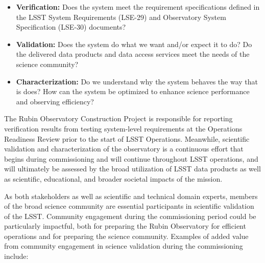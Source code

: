 \documentclass[SE,authoryear,toc]{lsstdoc}
\begin{document}
\begin{itemize}

\item \textbf{Verification:} Does the system meet the requirement specifications defined in the LSST System Requirements (LSE-29) and Observatory System Specification (LSE-30) documents?

\item \textbf{Validation:} Does the system do what we want and/or expect it to do? Do the delivered data products and data access services meet the needs of the science community?

\item \textbf{Characterization:} Do we understand why the system behaves the way that is does? How can the system be optimized to enhance science performance and observing efficiency?

\end{itemize}

The Rubin Observatory Construction Project is responsible for reporting verification results from testing system-level requirements at the Operations Readiness Review prior to the start of LSST Operations.
Meanwhile, scientific validation and characterization of the observatory is a continuous effort that begins during commissioning and will continue throughout LSST operations, and will ultimately be assessed by the broad utilization of LSST data products as well as scientific, educational, and broader societal impacts of the mission.

As both stakeholders as well as scientific and technical domain experts, members of the broad science community are essential participants in scientific validation of the LSST.
Community engagement during the commissioning period could be particularly impactful, both for preparing the Rubin Observatory for efficient operations and for preparing the science community.
Examples of added value from community engagement in science validation during the commissioning include:
\end{document}
